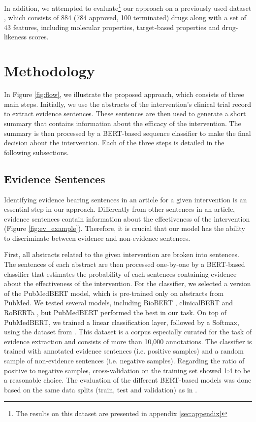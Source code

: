 \documentclass[11pt]{article}
\begin{document}
In addition, we attempted to evaluate\footnote{The results on this dataset are presented in appendix \ref{sec:appendix}} our approach on a previously used dataset \cite{gayvert2016data}, which consists of 884 (784 approved, 100 terminated) drugs along with a set of 43 features, including molecular properties, target-based properties and drug-likeness scores. 

\section{Methodology}

In Figure \ref{fig:flow}, we illustrate the proposed approach, which consists of three main steps. Initially, we use the abstracts of the intervention's clinical trial record to extract evidence sentences. These sentences are then used to generate a short summary that contains information about the efficacy of the intervention. The summary is then processed by a BERT-based sequence classifier to make the final decision about the intervention.  Each of the three steps is detailed in the following subsections.

\subsection{Evidence Sentences}
\label{sec:evid_sent}
Identifying evidence bearing sentences in an article for a given intervention is an essential step in our approach. Differently from other sentences in an article, evidence sentences contain information about the effectiveness of the intervention (Figure \ref{fig:ev_example}). Therefore, it is crucial that our model has the ability to discriminate between evidence and non-evidence sentences.

First, all abstracts related to the given intervention are broken into sentences. The sentences of each abstract are then processed one-by-one by a BERT-based classifier that estimates the probability of each sentences containing evidence about the effectiveness of the intervention. For the classifier, we selected a version of the PubMedBERT \cite{gu2020domain} model, which is pre-trained only on abstracts from PubMed.  We tested several models, including BioBERT \cite{lee2020biobert}, clinicalBERT \cite{alsentzer2019publicly} and RoBERTa \cite{liu2019roberta}, but PubMedBERT performed the best in our task. On top of PubMedBERT, we trained a linear classification layer, followed by a Softmax, using the dataset from \cite{deyoung2020evidence}. This dataset is a corpus especially curated for the task of evidence extraction and consists of more than 10,000 annotations. The classifier is trained with annotated evidence sentences (i.e. positive samples) and a random sample of non-evidence sentences (i.e. negative samples). Regarding the ratio of positive to negative samples, cross-validation on the training set showed 1:4 to be a reasonable choice. The evaluation of the different BERT-based models was done based on the same data splits (train, test and validation) as in \cite{deyoung2020evidence}.
\end{document}
